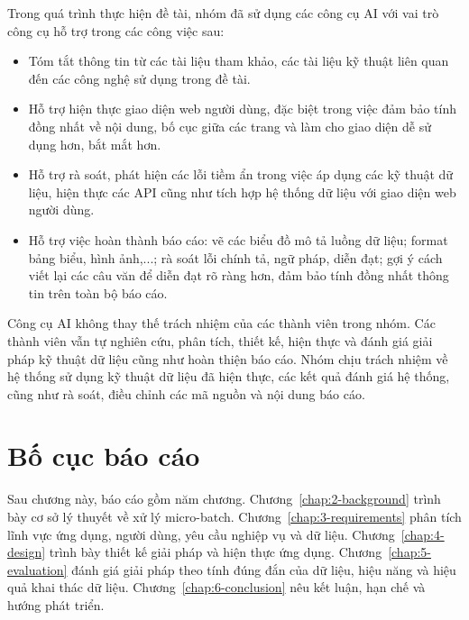 Trong quá trình thực hiện đề tài, nhóm đã sử dụng các công cụ AI với vai trò công cụ hỗ trợ trong các công việc sau:
\begin{itemize}
  \item Tóm tắt thông tin từ các tài liệu tham khảo, các tài liệu kỹ thuật liên quan đến các công nghệ sử dụng trong đề tài.
  \item Hỗ trợ hiện thực giao diện web người dùng, đặc biệt trong việc đảm bảo tính đồng nhất về nội dung, bố cục giữa các trang và làm cho giao diện dễ sử dụng hơn, bắt mắt hơn.
  \item Hỗ trợ rà soát, phát hiện các lỗi tiềm ẩn trong việc áp dụng các kỹ thuật dữ liệu, hiện thực các API cũng như tích hợp hệ thống dữ liệu với giao diện web người dùng.
  \item Hỗ trợ việc hoàn thành báo cáo: vẽ các biểu đồ mô tả luồng dữ liệu; format bảng biểu, hình ảnh,...; rà soát lỗi chính tả, ngữ pháp, diễn đạt; gợi ý cách viết lại các câu văn để diễn đạt rõ ràng hơn, đảm bảo tính đồng nhất thông tin trên toàn bộ báo cáo.
\end{itemize}

Công cụ AI không thay thế trách nhiệm của các thành viên trong nhóm. Các thành viên vẫn tự nghiên cứu, phân tích, thiết kế, hiện thực và đánh giá giải pháp kỹ thuật dữ liệu cũng như hoàn thiện báo cáo. Nhóm chịu trách nhiệm về hệ thống sử dụng kỹ thuật dữ liệu đã hiện thực, các kết quả đánh giá hệ thống, cũng như rà soát, điều chỉnh các mã nguồn và nội dung báo cáo.

\section{Bố cục báo cáo}
\label{sec:1-structure}

Sau chương này, báo cáo gồm năm chương. Chương~\ref{chap:2-background} trình bày cơ sở lý thuyết về xử lý micro-batch. Chương~\ref{chap:3-requirements} phân tích lĩnh vực ứng dụng, người dùng, yêu cầu nghiệp vụ và dữ liệu. Chương~\ref{chap:4-design} trình bày thiết kế giải pháp và hiện thực ứng dụng. Chương~\ref{chap:5-evaluation} đánh giá giải pháp theo tính đúng đắn của dữ liệu, hiệu năng và hiệu quả khai thác dữ liệu. Chương~\ref{chap:6-conclusion} nêu kết luận, hạn chế và hướng phát triển.
